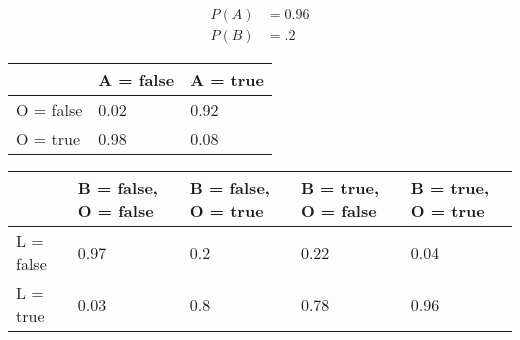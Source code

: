 \documentclass[11pt]{article}
\begin{document}
\[
\begin{aligned}
P(A) & = 0.96\\
P(B) & = .2
\end{aligned}
\]

\begin{longtable}[]{@{}lll@{}}
\toprule
& A = false & A = true\tabularnewline
\midrule
\endhead
O = false & 0.02 & 0.92\tabularnewline
O = true & 0.98 & 0.08\tabularnewline
\bottomrule
\end{longtable}

\begin{longtable}[]{@{}lllll@{}}
\toprule
\begin{minipage}[b]{0.10\columnwidth}\raggedright\strut
\strut
\end{minipage} & \begin{minipage}[b]{0.20\columnwidth}\raggedright\strut
B = false, O = false\strut
\end{minipage} & \begin{minipage}[b]{0.19\columnwidth}\raggedright\strut
B = false, O = true\strut
\end{minipage} & \begin{minipage}[b]{0.19\columnwidth}\raggedright\strut
B = true, O = false\strut
\end{minipage} & \begin{minipage}[b]{0.18\columnwidth}\raggedright\strut
B = true, O = true\strut
\end{minipage}\tabularnewline
\midrule
\endhead
\begin{minipage}[t]{0.10\columnwidth}\raggedright\strut
L = false\strut
\end{minipage} & \begin{minipage}[t]{0.20\columnwidth}\raggedright\strut
0.97\strut
\end{minipage} & \begin{minipage}[t]{0.19\columnwidth}\raggedright\strut
0.2\strut
\end{minipage} & \begin{minipage}[t]{0.19\columnwidth}\raggedright\strut
0.22\strut
\end{minipage} & \begin{minipage}[t]{0.18\columnwidth}\raggedright\strut
0.04\strut
\end{minipage}\tabularnewline
\begin{minipage}[t]{0.10\columnwidth}\raggedright\strut
L = true\strut
\end{minipage} & \begin{minipage}[t]{0.20\columnwidth}\raggedright\strut
0.03\strut
\end{minipage} & \begin{minipage}[t]{0.19\columnwidth}\raggedright\strut
0.8\strut
\end{minipage} & \begin{minipage}[t]{0.19\columnwidth}\raggedright\strut
0.78\strut
\end{minipage} & \begin{minipage}[t]{0.18\columnwidth}\raggedright\strut
0.96\strut
\end{minipage}\tabularnewline
\bottomrule
\end{longtable}
\end{document}
